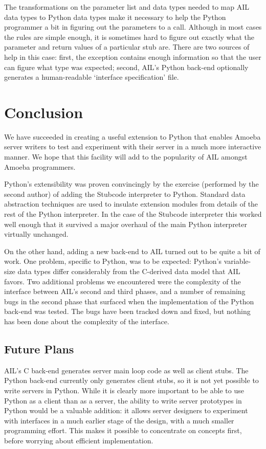 The transformations on the parameter list and data types needed to map
AIL data types to Python data types make it necessary to help the
Python programmer a bit in figuring out the parameters to a call.
Although in most cases the rules are simple enough, it is sometimes
hard to figure out exactly what the parameter and return values of a
particular stub are.  There are two sources of help in this case:
first, the exception contains enough information so that the user can
figure what type was expected; second, AIL's Python back-end
optionally generates a human-readable `interface specification' file.

\section{Conclusion}

We have succeeded in creating a useful extension to Python that
enables Amoeba server writers to test and experiment with their server
in a much more interactive manner.  We hope that this facility will
add to the popularity of AIL amongst Amoeba programmers.

Python's extensibility was proven convincingly by the exercise
(performed by the second author) of adding the Stubcode interpreter to
Python.  Standard data abstraction techniques are used to insulate
extension modules from details of the rest of the Python interpreter.
In the case of the Stubcode interpreter this worked well enough that
it survived a major overhaul of the main Python interpreter virtually
unchanged.

On the other hand, adding a new back-end to AIL turned out to be quite
a bit of work.  One problem, specific to Python, was to be expected:
Python's variable-size data types differ considerably from the
C-derived data model that AIL favors.  Two additional problems we
encountered were the complexity of the interface between AIL's second
and third phases, and a number of remaining bugs in the second phase
that surfaced when the implementation of the Python back-end was
tested.  The bugs have been tracked down and fixed, but nothing
has been done about the complexity of the interface.

\subsection{Future Plans}

AIL's C back-end generates server main loop code as well as client
stubs.  The Python back-end currently only generates client stubs, so
it is not yet possible to write servers in Python.  While it is
clearly more important to be able to use Python as a client than as a
server, the ability to write server prototypes in Python would be a
valuable addition: it allows server designers to experiment with
interfaces in a much earlier stage of the design, with a much smaller
programming effort.  This makes it possible to concentrate on concepts
first, before worrying about efficient implementation.

